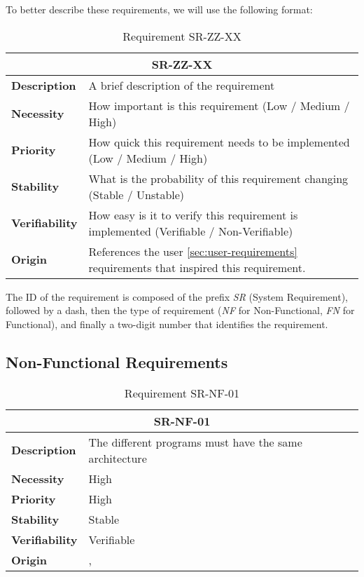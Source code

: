 To better describe these requirements, we will use the following format:

\begin{table}
    \centering
    \begin{tabular}{l p{10cm}}
        \toprule
        \multicolumn{2}{c}{SR-ZZ-XX} \\
        \toprule
        \textbf{Description}        & A brief description of the requirement \\
        \textbf{Necessity}          & How important is this requirement (Low / Medium / High) \\
        \textbf{Priority}           & How quick this requirement needs to be implemented (Low / Medium / High) \\
        \textbf{Stability}          & What is the probability of this requirement changing (Stable / Unstable) \\
        \textbf{Verifiability}      & How easy is it to verify this requirement is implemented (Verifiable / Non-Verifiable) \\
        \textbf{Origin}             & References the user \ref{sec:user-requirements} requirements that inspired this requirement.  \\
    \end{tabular}
    \caption{Requirement SR-ZZ-XX}
\end{table}

The ID of the requirement is composed of the prefix \textit{SR} (System Requirement), followed by a dash, then the type of requirement (\textit{NF} for Non-Functional, \textit{FN} for Functional), and finally a two-digit number that identifies the requirement.

\subsection{Non-Functional Requirements}
\begin{table}[H]
    \centering
    \begin{tabular}{l p{10cm}}
        \toprule
        \multicolumn{2}{c}{SR-NF-01} \\
        \toprule
        \textbf{Description}        & The different programs must have the same architecture \\
        \textbf{Necessity}          &  High \\
        \textbf{Priority}           &  High \\
        \textbf{Stability}          &  Stable \\
        \textbf{Verifiability}      & Verifiable \\
        \textbf{Origin}             &  \textit{\nameref{tab:ur-re-01}}, \textit{\nameref{tab:ur-ca-14}} \\
    \end{tabular}
    \caption{Requirement SR-NF-01}
    \label{tab:sr-nf-01}
\end{table}

